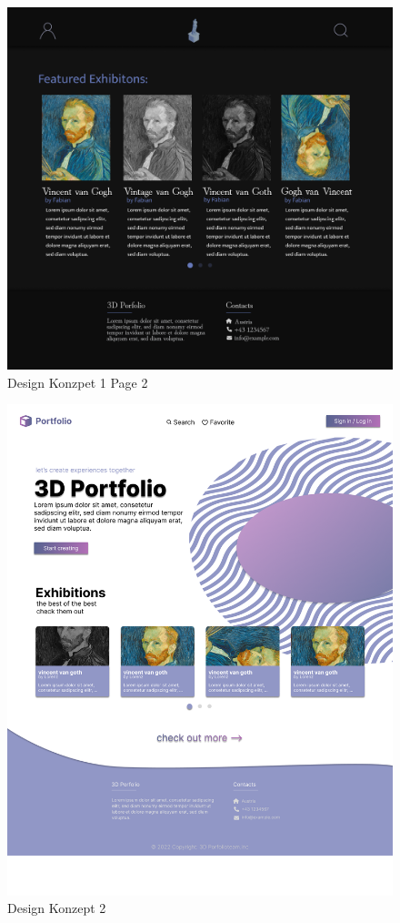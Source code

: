 \begin{figure}
    \centering
    \includegraphics[scale=0.3]{pics/DesignKonzept1_2.png}
    \caption{Design Konzpet 1 Page 2}
\end{figure}

\begin{figure}
    \centering
    \includegraphics[scale=0.3]{pics/DesignKonzept2.png}
    \caption{Design Konzept 2}
\end{figure}

